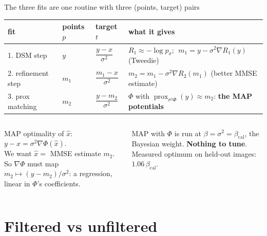 \documentclass[10pt,aspectratio=169]{beamer}
\newcommand{\bcal}{\beta_{\mathrm{cal}}}
\begin{document}
\begin{frame}{The three fits are one routine with three (points, target) pairs}
\centering
\renewcommand{\arraystretch}{1.5}
\begin{tabular}{@{}llll@{}}
\toprule
fit & points $p$ & target $t$ & what it gives\\\midrule
1. DSM step & $y$ & $\dfrac{y-x}{\sigma^2}$ & $R_1\approx-\log p_\sigma$; $\;m_1=y-\sigma^2\nabla R_1(y)$ (Tweedie)\\
2. refinement step & $m_1$ & $\dfrac{m_1-x}{\sigma^2}$ & $m_2=m_1-\sigma^2\nabla R_2(m_1)$ (better MMSE estimate)\\
3. prox matching & $m_2$ & $\dfrac{y-m_2}{\sigma^2}$ & $\Phi$ with $\operatorname{prox}_{\sigma^2\Phi}(y)\approx m_2$: \textbf{the MAP potentials}\\
\bottomrule
\end{tabular}

\bigskip
\begin{columns}[T]
\begin{oldbox}[title={Why fit 3 is the right target}]
MAP optimality of $\hat x$: \ $y-\hat x=\sigma^2\nabla\Phi(\hat x)$.\\
We want $\hat x=$ MMSE estimate $m_2$. So $\nabla\Phi$ must map $m_2\mapsto(y-m_2)/\sigma^2$:
a regression, linear in $\Phi$'s coefficients.
\end{oldbox}
\begin{keybox}[title={Consequence}]
MAP with $\Phi$ is run at $\beta=\sigma^2=\bcal$, the Bayesian weight. \textbf{Nothing to tune}.
Measured optimum on held-out images: $1.06\,\bcal$.
\end{keybox}
\end{columns}
\end{frame}

\section{Filtered vs unfiltered}
\end{document}
